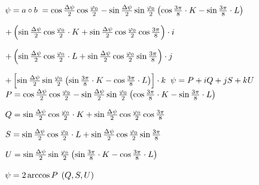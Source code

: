 \documentclass{article}
\begin{document}

$ \psi=a\circ b \\$
$		= \cos\frac{\Delta \psi}{2} \cos\frac{\varphi_0}{2} 
		 -\sin\frac{\Delta \psi}{2} \sin\frac{\varphi_0}{2} 
			\left (
				\cos \frac{3\pi}{8} \cdot K - \sin \frac{3\pi}{8}\cdot L
			\right ) \\$

$		+ \left (
				\sin\frac{\Delta \psi}{2} \cos\frac{\varphi_0}{2} \cdot K 
			+  \sin\frac{\Delta \psi}{2} \cos\frac{\varphi_0}{2} \cos\frac{3\pi}{8} 
\right )	\cdot i	\\$

$		+ \left (
				\sin\frac{\Delta \psi}{2} \cos\frac{\varphi_0}{2} \cdot L
			+  \sin\frac{\Delta \psi}{2} \cos\frac{\varphi_0}{2} \sin\frac{3\pi}{8} 
\right )	\cdot j	\\$

$		+ \left [
				\sin\frac{\Delta \psi}{2} \sin\frac{\varphi_0}{2} 
				\left (
					\sin \frac{3\pi}{8} \cdot K - \cos \frac{3\pi}{8}\cdot L
				\right )
			\right ]	\cdot k	\\$
$ \psi=P+iQ+jS+kU \\$
$	 P = \cos\frac{\Delta \psi}{2} \cos\frac{\varphi_0}{2} 
		 -\sin\frac{\Delta \psi}{2} \sin\frac{\varphi_0}{2} 
			\left (
				\cos \frac{3\pi}{8} \cdot K - \sin \frac{3\pi}{8}\cdot L
			\right ) \\$

$		Q =
				\sin\frac{\Delta \psi}{2} \cos\frac{\varphi_0}{2} \cdot K 
			+  \sin\frac{\Delta \psi}{2} \cos\frac{\varphi_0}{2} \cos\frac{3\pi}{8} 
	\\$

$		S =
				\sin\frac{\Delta \psi}{2} \cos\frac{\varphi_0}{2} \cdot L
			+  \sin\frac{\Delta \psi}{2} \cos\frac{\varphi_0}{2} \sin\frac{3\pi}{8} 
	\\$

$		U =
				\sin\frac{\Delta \psi}{2} \sin\frac{\varphi_0}{2} 
				\left (
					\sin \frac{3\pi}{8} \cdot K - \cos \frac{3\pi}{8}\cdot L
				\right )
	\\$

$ \psi=2\arccos{P} \\$
$ (Q,S,U) \\$
\end{document}
